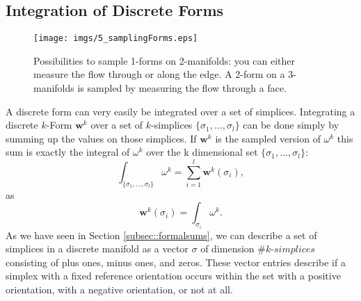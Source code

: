 %


\subsection{Integration of Discrete Forms}

\begin{figure}%
\texttt{[image: imgs/5\_samplingForms.eps]}%
\caption{Possibilities to sample 1-forms on 2-manifolds: you can either measure the flow through or along the edge. A 2-form on a 3-manifolds is sampled by measuring the flow through a face.}%
\label{fig:5_samplingForms}%
\end{figure}

A discrete form can very easily be integrated over a set of simplices. Integrating a discrete $k$-Form $\textbf{w}^k$ over a set of $k$-simplices $\{\sigma_1,...,\sigma_l\}$ can be done simply by summing up the values on those simplices. If $\textbf{w}^k$ is the sampled version of $\omega^k$ this sum is exactly the integral of $\omega^k$  over the k dimensional set $\{\sigma_1,...,\sigma_l\}$:
\[\int_{\{\sigma_1,...,\sigma_l\}} \omega^k = \sum_{i=1}^l \textbf{w}^k(\sigma_i),\]
as
\[\textbf{w}^k(\sigma_i) = \int_{\sigma_i} \omega^k.\]
As we have seen in Section \ref{subsec::formalsums}, we can describe a set of simplices in a discrete manifold as a vector $\sigma$ of dimension $\# k$-$simplices$ consisting of plus ones, minus ones, and zeros. These vector entries describe if a simplex with a fixed reference orientation occurs within the set with a positive orientation, with a negative orientation, or not at all. 

